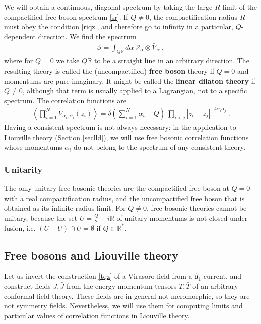 \documentclass[12pt, a4paper, notitlepage, twoside]{report}
\numberwithin{equation}{section}
\theoremstyle{break}
\begin{document}
We will obtain a continuous, diagonal spectrum by taking 
the large $R$ limit of the compactified free boson spectrum \eqref{sr}.
If $Q\neq 0$, the compactification radius $R$ must obey the condition \eqref{riqz}, and therefore go to infinity in a particular, $Q$-dependent direction. We find the spectrum 
\begin{align}
 \boxed{ \mathcal{S} = \int_{Q\mathbb{R}} d\alpha\ \mathcal{V}_\alpha\otimes \bar{\mathcal{V}}_\alpha}\ ,
\end{align}
where for $Q=0$ we take $Q\mathbb{R}$ to be a straight line in an arbitrary direction.  
The resulting theory is called the (uncompactified) \textbf{\boldmath free boson} theory if $Q=0$ and momentums are pure imaginary. It might be called the \textbf{\boldmath linear dilaton theory} if $Q\neq 0$, although that term is usually applied to a Lagrangian, not to a specific spectrum. 
The correlation functions are 
\begin{align}
 \left\langle \prod_{i=1}^N V_{\alpha_i,\alpha_i}(z_i)\right\rangle = \delta\left({\textstyle \sum}_{i=1}^N\alpha_i-Q\right)\ \prod_{i<j} |z_i-z_j|^{-4\alpha_i\alpha_j} \ .
\label{dpzz}
\end{align}
Having a consistent spectrum is not always necessary: in the application to Liouville theory (Section \ref{seclld}), we will use free bosonic correlation functions whose momentums $\alpha_i$ do not belong to the spectrum of any consistent theory.

\subsubsection{Unitarity}

The only unitary free bosonic theories are the compactified free boson at $Q=0$ with a real compactification radius, and the uncompactified free boson that is obtained as its infinite radius limit. For $Q\neq 0$, free bosonic theories cannot be unitary, because the set $U=\frac{Q}{2}+i\mathbb{R}$ of unitary momentums is not closed under fusion, i.e. $(U+U)\cap U = \emptyset$ if $Q\in \mathbb{R}^*$.


\subsection{Free bosons and Liouville theory \label{seclld}}

Let us invert the 
construction \eqref{tqz} of a Virasoro field from a $\hat{\mathfrak{u}}_1$ current, and construct fields $J,\bar J$ from the energy-momentum tensors $T,\bar T$ of an arbitrary conformal field theory. 
These fields are in general not meromorphic, so they are not symmetry fields.
Nevertheless, we will use them for computing limits and particular values of correlation functions in Liouville theory.
\end{document}
